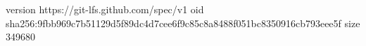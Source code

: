 version https://git-lfs.github.com/spec/v1
oid sha256:9fbb969c7b51129d5f89dc4d7cee6f9c85c8a8488f051bc8350916cb793eee5f
size 349680
